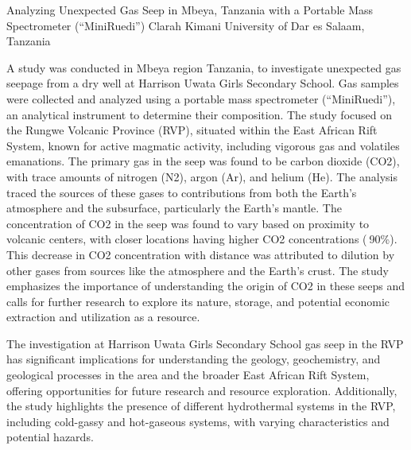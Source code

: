\begin{conf-abstract}
{Analyzing Unexpected Gas Seep in Mbeya, Tanzania with a Portable Mass Spectrometer (“MiniRuedi”)}
{Clarah Kimani}
{University of Dar es Salaam, Tanzania}
{A study was conducted in Mbeya region Tanzania, to investigate unexpected gas seepage from a dry well at Harrison Uwata Girls Secondary School. Gas samples were collected and analyzed using a portable mass spectrometer (“MiniRuedi”), an analytical instrument to determine their composition. The study focused on the Rungwe Volcanic Province (RVP), situated within the East African Rift System, known for active magmatic activity, including vigorous gas and volatiles emanations. The primary gas in the seep was found to be carbon dioxide (CO2), with trace amounts of nitrogen (N2), argon (Ar), and helium (He). The analysis traced the sources of these gases to contributions from both the Earth's atmosphere and the subsurface, particularly the Earth's mantle.
The concentration of CO2 in the seep was found to vary based on proximity to volcanic centers, with closer locations having higher CO2 concentrations ($~$90\%). This decrease in CO2 concentration with distance was attributed to dilution by other gases from sources like the atmosphere and the Earth's crust. The study emphasizes the importance of understanding the origin of CO2 in these seeps and calls for further research to explore its nature, storage, and potential economic extraction and utilization as a resource.

The investigation at Harrison Uwata Girls Secondary School gas seep in the RVP has significant implications for understanding the geology, geochemistry, and geological processes in the area and the broader East African Rift System, offering opportunities for future research and resource exploration. Additionally, the study highlights the presence of different hydrothermal systems in the RVP, including cold-gassy and hot-gaseous systems, with varying characteristics and potential hazards.}
\end{conf-abstract}
